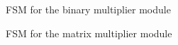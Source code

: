 \documentclass[12pt]{article}
\begin{document}
\begin{figure}[h!]
	\begin{center}
	 \caption{FSM for the binary multiplier module}
	\end{center}
\end{figure}
\clearpage
\begin{figure}[h!]
	\begin{center}
	 \caption{FSM for the matrix multiplier module}
	\end{center}
\end{figure}
\end{document}
